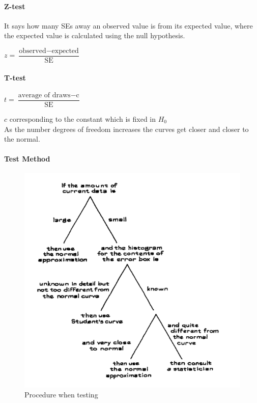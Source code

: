 \paragraph{Z-test}
It says how many SEs away an observed value is from its expected value,
where the expected value is calculated using the null hypothesis.
\begin{center}
	$z=\dfrac{\text{observed}-\text{expected}}{\text{SE}}$
\end{center}
\paragraph{T-test}
\begin{center}
	$t=\dfrac{\text{average of draws}-\text{c}}{\text{SE}}$
\end{center}
$c$ corresponding to the constant which is fixed in $H_{0}$\\
As the number degrees of freedom increases the curves get closer and 
closer to the normal.
\paragraph{Test Method}
\begin{figure}[H]
	\begin{center}
		\includegraphics[width=.5\textwidth]{./chaps/27sec/images/1_methodApproxNorm.png}
	\end{center}
	\caption{Procedure when testing}
	\label{fig:1_mehtodeApproxNorm}
\end{figure}
